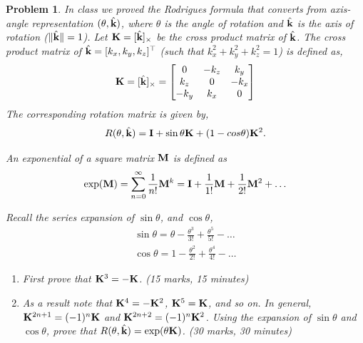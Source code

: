 \documentclass[twocolumn]{article}
\newtheorem{prob}{Problem}
\newif\ifsol
\begin{document}
\begin{prob}
  In class we proved the Rodrigues formula that converts from axis-angle
  representation $(\theta, \hat{\mathbf{k}})$, where $\theta$ is the angle of rotation
  and $\hat{\mathbf{k}}$ is the axis of rotation ($\|\hat{\mathbf{k}}\| = 1$). Let $\mathbf{K} = [\hat{\mathbf{k}}]_{\times}$ be
  the cross product matrix of $\hat{\mathbf{k}}$. The cross product matrix
  of $\hat{\mathbf{k}} = [k_x, k_y, k_z]^\top$ (such that $k_x^2 + k_y^2 + k_z^2 = 1$) is defined as,
    \begin{align}
      \mathbf{K} = [\hat{\mathbf{k}}]_{\times} = \begin{bmatrix}
        0 & -k_z & k_y \\
        k_z & 0 & -k_x \\
        -k_y & k_x & 0
      \end{bmatrix}
    \end{align}
  The corresponding rotation matrix is
  given by,
  \begin{align}
    R(\theta, \hat{\mathbf{k}}) = \mathbf{I} + \sin \theta \mathbf{K} + (1-cos \theta) \mathbf{K}^2.
  \end{align}

  An exponential of a square matrix $\mathbf{M}$ is defined as
  \begin{align}
    \exp(\mathbf{M}) = \sum_{n=0}^\infty \frac{1}{n!} \mathbf{M}^k = \mathbf{I} + \frac{1}{1!}\mathbf{M} + \frac{1}{2!}\mathbf{M}^2 + \dots
  \end{align}

  Recall the series expansion of $\sin \theta$, and $\cos \theta$,
  \begin{align}
    \sin \theta = \theta - \frac{\theta^3}{3!} + \frac{\theta^5}{5!} - \dots
    \\
    \cos \theta = 1 - \frac{\theta^2}{2!} + \frac{\theta^4}{4!} - \dots
  \end{align}

  \begin{enumerate}
  \item First prove that $\mathbf{K}^3 = - \mathbf{K}$. (15 marks, 15 minutes)
  \item As a result note that $\mathbf{K}^4 = - \mathbf{K}^2$, $\mathbf{K}^5 = \mathbf{K}$, and so on.
    In general, $\mathbf{K}^{2n+1} =
    (-1)^n\mathbf{K}$ and $\mathbf{K}^{2n+2} = (-1)^n\mathbf{K}^2$. Using the expansion of $\sin\theta$ and $\cos\theta$, prove that
    $R(\theta, \hat{\mathbf{k}}) = \exp(\theta \mathbf{K})$. (30 marks, 30 minutes)
  \end{enumerate}
\end{prob}
\ifsol
\end{document}
